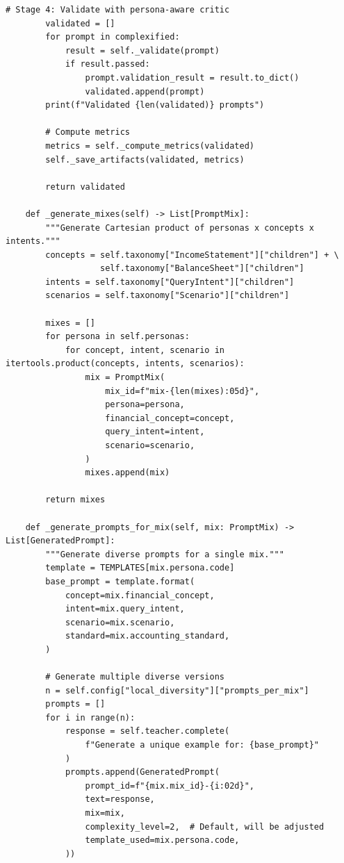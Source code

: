 \begin{lstlisting}[language=jsonx,caption={simula\_financial\_prompt\_generator.py}]
        # Stage 4: Validate with persona-aware critic
        validated = []
        for prompt in complexified:
            result = self._validate(prompt)
            if result.passed:
                prompt.validation_result = result.to_dict()
                validated.append(prompt)
        print(f"Validated {len(validated)} prompts")
        
        # Compute metrics
        metrics = self._compute_metrics(validated)
        self._save_artifacts(validated, metrics)
        
        return validated
    
    def _generate_mixes(self) -> List[PromptMix]:
        """Generate Cartesian product of personas x concepts x intents."""
        concepts = self.taxonomy["IncomeStatement"]["children"] + \
                   self.taxonomy["BalanceSheet"]["children"]
        intents = self.taxonomy["QueryIntent"]["children"]
        scenarios = self.taxonomy["Scenario"]["children"]
        
        mixes = []
        for persona in self.personas:
            for concept, intent, scenario in itertools.product(concepts, intents, scenarios):
                mix = PromptMix(
                    mix_id=f"mix-{len(mixes):05d}",
                    persona=persona,
                    financial_concept=concept,
                    query_intent=intent,
                    scenario=scenario,
                )
                mixes.append(mix)
        
        return mixes
    
    def _generate_prompts_for_mix(self, mix: PromptMix) -> List[GeneratedPrompt]:
        """Generate diverse prompts for a single mix."""
        template = TEMPLATES[mix.persona.code]
        base_prompt = template.format(
            concept=mix.financial_concept,
            intent=mix.query_intent,
            scenario=mix.scenario,
            standard=mix.accounting_standard,
        )
        
        # Generate multiple diverse versions
        n = self.config["local_diversity"]["prompts_per_mix"]
        prompts = []
        for i in range(n):
            response = self.teacher.complete(
                f"Generate a unique example for: {base_prompt}"
            )
            prompts.append(GeneratedPrompt(
                prompt_id=f"{mix.mix_id}-{i:02d}",
                text=response,
                mix=mix,
                complexity_level=2,  # Default, will be adjusted
                template_used=mix.persona.code,
            ))
        

\end{lstlisting}
